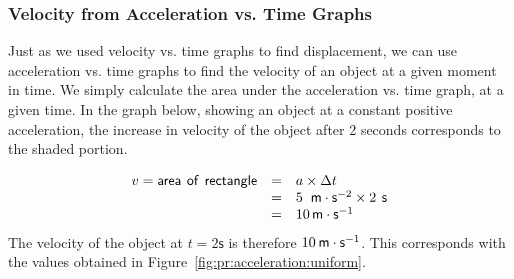         \label{m38795*uid115}
\subsubsection*{Velocity from Acceleration vs. Time Graphs}
            \nopagebreak
          \label{m38795*id72754}Just as we used velocity vs. time graphs to find displacement, we can use acceleration vs. time graphs to find the velocity of an object at a given moment in time. We simply calculate the area under the acceleration vs. time graph, at a given time. In the graph below, showing an object at a constant positive acceleration, the increase in velocity of the object after 2 seconds corresponds to the shaded portion.\par 
          \label{m38795*id72760}\nopagebreak\noindent{}
            
    \begin{equation}
    \begin{array}{ccc}\hfill v=\mathsf{area}\phantom{\rule{4pt}{0ex}}\mathsf{of}\phantom{\rule{4pt}{0ex}}\mathsf{rectangle}& =& a\ensuremath{\times}\Delta t\hfill \\ & =& 5\phantom{\rule{4pt}{0ex}}\phantom{\rule{0.166667em}{0ex}}\mathsf{m}\ensuremath{\cdot}{\mathsf{s}}^{-2}\ensuremath{\times}2\phantom{\rule{4pt}{0ex}}\mathsf{s}\hfill \\ & =& 10\phantom{\rule{0.166667em}{0ex}}\mathsf{m}\ensuremath{\cdot}{\mathsf{s}}^{-1}\hfill \end{array}
      \end{equation}
          \label{m38795*id72897}The velocity of the object at $t=2\mathsf{s}$ is therefore $10\phantom{\rule{2pt}{0ex}}\mathsf{m}\ensuremath{\cdot}\mathsf{s}{}^{-1}$. This corresponds with the values obtained in Figure~\ref{fig:pr:acceleration:uniform}.\par 
    \label{m38795*cid8}
